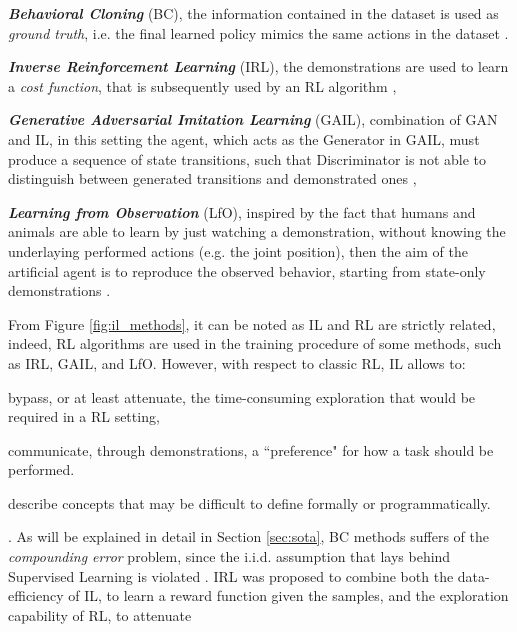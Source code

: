 \begin{itemize*}
    \item \textbf{\textit{Behavioral Cloning}} (BC), the information contained in the dataset is used as \textit{ground
    truth}, i.e. the final learned policy mimics the same actions in the dataset \cite{}.
    \item \textbf{\textit{Inverse Reinforcement Learning}} (IRL), the demonstrations are used to learn a \textit{cost
    function}, that is subsequently used by an RL algorithm \cite{},
    \item \textbf{\textit{Generative Adversarial Imitation Learning}} (GAIL), combination of GAN \cite{} and IL, in this
    setting the agent, which acts as the Generator in GAIL, must produce a sequence of state transitions, such that
    Discriminator is not able to distinguish between generated transitions and demonstrated ones \cite{},
    \item \textbf{\textit{Learning from Observation}} (LfO), inspired by the fact that humans and animals are able to
    learn by just watching a demonstration, without knowing the underlaying performed actions (e.g. the joint position),
    then the aim of the artificial agent is to reproduce the observed behavior, starting from state-only demonstrations
    \cite{torabi2019recent_advances_lfo}.   
\end{itemize*}

From Figure \ref{fig:il_methods}, it can be noted as IL and RL are strictly related, indeed, RL algorithms are used in
the training procedure of some methods, such as IRL, GAIL, and LfO. However, with respect to classic RL, IL allows to:
\begin{enumerate*}[label=\textbf{(\arabic*)}]
    \item bypass, or at least attenuate, the time-consuming exploration that would be required in a RL setting, 
    \item communicate, through demonstrations, a ``preference" for how a task should be performed.
    \item describe concepts that may be difficult to define formally or programmatically. \end{enumerate*}. As will be
explained in detail in Section \ref{sec:sota}, BC methods suffers of the \textit{compounding error} problem, since the
i.i.d. assumption that lays behind Supervised Learning is violated \cite{}. IRL was proposed to combine both the
data-efficiency of IL, to learn a reward function given the samples, and the exploration capability of RL, to attenuate

